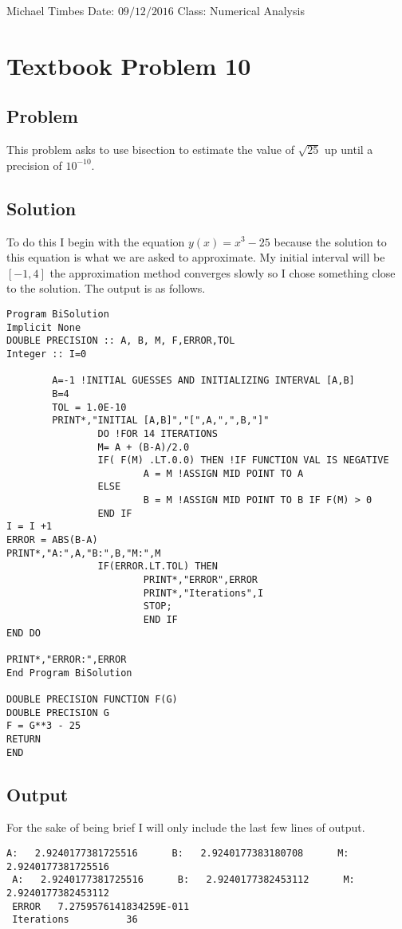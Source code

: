 \documentclass[12pt]{article}
\author{Michael Timbes}
\date{\today}
\begin{document}
\flushleft Michael Timbes\newline
Date: $09/12/2016$ \newline
Class: Numerical Analysis
\section{Textbook Problem 10}

\subsection{Problem}
This problem asks to use bisection to estimate the value of $\sqrt{25}$ up until a precision of $10^{-10}$. 
\subsection{Solution}
To do this I begin with the equation $y(x) = x^{3} -25$ because the solution to this equation is what we are asked to approximate. My initial interval will be $[-1,4]$ the approximation method converges slowly so I chose something close to the solution. The output is as follows.
\begin{lstlisting}[language = FORTRAN]
Program BiSolution
Implicit None
DOUBLE PRECISION :: A, B, M, F,ERROR,TOL
Integer :: I=0

        A=-1 !INITIAL GUESSES AND INITIALIZING INTERVAL [A,B]
        B=4
        TOL = 1.0E-10
        PRINT*,"INITIAL [A,B]","[",A,",",B,"]"
                DO !FOR 14 ITERATIONS
                M= A + (B-A)/2.0
                IF( F(M) .LT.0.0) THEN !IF FUNCTION VAL IS NEGATIVE
                        A = M !ASSIGN MID POINT TO A
                ELSE
                        B = M !ASSIGN MID POINT TO B IF F(M) > 0
                END IF
I = I +1
ERROR = ABS(B-A)
PRINT*,"A:",A,"B:",B,"M:",M
                IF(ERROR.LT.TOL) THEN
                        PRINT*,"ERROR",ERROR
                        PRINT*,"Iterations",I
                        STOP;
                        END IF
END DO

PRINT*,"ERROR:",ERROR
End Program BiSolution

DOUBLE PRECISION FUNCTION F(G)
DOUBLE PRECISION G
F = G**3 - 25
RETURN
END
\end{lstlisting}
\subsection{Output}
For the sake of being brief I will only include the last few lines of output.
\begin{verbatim}
A:   2.9240177381725516      B:   2.9240177383180708      M:   2.9240177381725516     
 A:   2.9240177381725516      B:   2.9240177382453112      M:   2.9240177382453112     
 ERROR   7.2759576141834259E-011
 Iterations          36

\end{verbatim}
\end{document}
